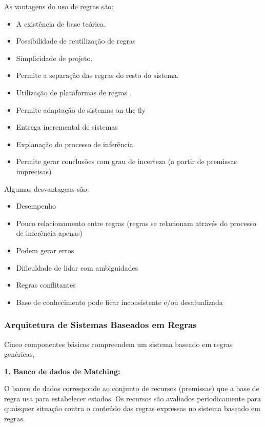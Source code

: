\documentclass[12pt,a4paper,compsoc]{IEEEtran}
\begin{document}
  As vantagens do uso de regras são:

  \begin{itemize}
    \item A existência de base teórica.
    \item Possibilidade de reutilização de regras
    \item Simplicidade de projeto. 
    \item Permite a separação das regras do resto do sistema.
    \item Utilização de plataformas de regras .
    \item Permite adaptação de sistemas on-the-fly
    \item Entrega incremental de sistemas
    \item Explanação do processo de inferência
    \item Permite gerar conclusões com grau de incerteza (a partir de premissas imprecisas)
  \end{itemize}
  
  Algumas desvantagens são:

  \begin{itemize}
    \item Desempenho
    \item Pouco relacionamento entre regras (regras se relacionam através do processo de inferência
    apenas)
    \item Podem gerar erros
    \item Dificuldade de lidar com ambiguidades
    \item Regras conflitantes
    \item Base de conhecimento  pode ficar inconsistente e/ou desatualizada  
  \end{itemize}


\subsubsection{Arquitetura de Sistemas Baseados em Regras}

  Cinco componentes básicos compreendem um sistema baseado em regras genéricas,

  \textbf{1. Banco de dados de Matching:}

  O banco de dados corresponde ao conjunto de recursos (premissas) que a base de regra usa para
  estabelecer estados. Os recursos são avaliados periodicamente para quaisquer situação contra o
  conteúdo das regras expressas no sistema baseado em regras.
\end{document}

